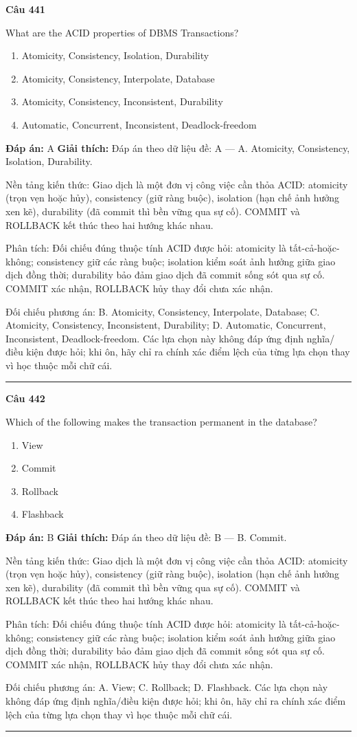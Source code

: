 \documentclass[11pt,a4paper]{article}
\newenvironment{question}[1]{%
  \par\vspace{1em}\noindent\textbf{\large Câu #1}\par\vspace{0.4em}
}{%
  \par\vspace{1em}\hrule\vspace{0.6em}
}
\newenvironment{choices}{%
  \begin{enumerate}[label=\textbf{\Alph*.},leftmargin=2.2em,itemsep=2pt,topsep=3pt]
}{%
  \end{enumerate}
}
\newcommand{\choice}{\item}
\begin{document}
\begin{question}{441}
What are the ACID properties of DBMS Transactions?
\begin{choices}
\choice Atomicity, Consistency, Isolation, Durability
\choice Atomicity, Consistency, Interpolate, Database
\choice Atomicity, Consistency, Inconsistent, Durability
\choice Automatic, Concurrent, Inconsistent, Deadlock-freedom
\end{choices}
\textbf{Đáp án:} A
\textbf{Giải thích:} Đáp án theo dữ liệu đề: A — A. Atomicity, Consistency, Isolation, Durability.

Nền tảng kiến thức: Giao dịch là một đơn vị công việc cần thỏa ACID: atomicity (trọn vẹn hoặc hủy), consistency (giữ ràng buộc), isolation (hạn chế ảnh hưởng xen kẽ), durability (đã commit thì bền vững qua sự cố). COMMIT và ROLLBACK kết thúc theo hai hướng khác nhau.

Phân tích: Đối chiếu đúng thuộc tính ACID được hỏi: atomicity là tất-cả-hoặc-không; consistency giữ các ràng buộc; isolation kiểm soát ảnh hưởng giữa giao dịch đồng thời; durability bảo đảm giao dịch đã commit sống sót qua sự cố. COMMIT xác nhận, ROLLBACK hủy thay đổi chưa xác nhận.

Đối chiếu phương án: B. Atomicity, Consistency, Interpolate, Database; C. Atomicity, Consistency, Inconsistent, Durability; D. Automatic, Concurrent, Inconsistent, Deadlock-freedom. Các lựa chọn này không đáp ứng định nghĩa/điều kiện được hỏi; khi ôn, hãy chỉ ra chính xác điểm lệch của từng lựa chọn thay vì học thuộc mỗi chữ cái.
\end{question}

\begin{question}{442}
Which of the following makes the transaction permanent in the database?
\begin{choices}
\choice View
\choice Commit
\choice Rollback
\choice Flashback
\end{choices}
\textbf{Đáp án:} B
\textbf{Giải thích:} Đáp án theo dữ liệu đề: B — B. Commit.

Nền tảng kiến thức: Giao dịch là một đơn vị công việc cần thỏa ACID: atomicity (trọn vẹn hoặc hủy), consistency (giữ ràng buộc), isolation (hạn chế ảnh hưởng xen kẽ), durability (đã commit thì bền vững qua sự cố). COMMIT và ROLLBACK kết thúc theo hai hướng khác nhau.

Phân tích: Đối chiếu đúng thuộc tính ACID được hỏi: atomicity là tất-cả-hoặc-không; consistency giữ các ràng buộc; isolation kiểm soát ảnh hưởng giữa giao dịch đồng thời; durability bảo đảm giao dịch đã commit sống sót qua sự cố. COMMIT xác nhận, ROLLBACK hủy thay đổi chưa xác nhận.

Đối chiếu phương án: A. View; C. Rollback; D. Flashback. Các lựa chọn này không đáp ứng định nghĩa/điều kiện được hỏi; khi ôn, hãy chỉ ra chính xác điểm lệch của từng lựa chọn thay vì học thuộc mỗi chữ cái.
\end{question}
\end{document}
